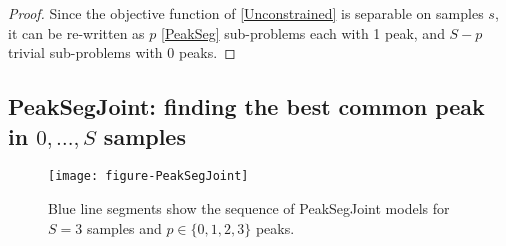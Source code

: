 \documentclass{article} %
\DeclareMathOperator*{\argmin}{arg\,min}
\begin{document}
\begin{proof}
  Since the objective function of \ref{Unconstrained} is separable on
  samples $s$, it can be re-written as $p$ \ref{PeakSeg} sub-problems
  each with 1 peak, and $S-p$ trivial sub-problems with 0 peaks.
  


\end{proof}

\subsection{PeakSegJoint: finding the best common peak in $0,\dots, S$
  samples}

\begin{figure}[b!]
  \centering
  \texttt{[image: figure-PeakSegJoint]}
  \caption{Blue line segments show the sequence of PeakSegJoint models
    for $S=3$ samples and $p\in\{0, 1, 2, 3\}$ peaks.}
  \label{fig:PeakSegJoint}
\end{figure}
\end{document}
